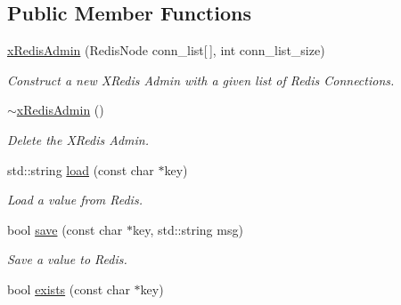 \subsection*{Public Member Functions}
\begin{DoxyCompactItemize}
\item 
\hypertarget{classxRedisAdmin_ae59b7611ff2d0cd4549794e4622d1251}{\hyperlink{classxRedisAdmin_ae59b7611ff2d0cd4549794e4622d1251}{x\-Redis\-Admin} (Redis\-Node conn\-\_\-list\mbox{[}$\,$\mbox{]}, int conn\-\_\-list\-\_\-size)}\label{classxRedisAdmin_ae59b7611ff2d0cd4549794e4622d1251}

\begin{DoxyCompactList}\small\item\em Construct a new X\-Redis Admin with a given list of Redis Connections. \end{DoxyCompactList}\item 
\hypertarget{classxRedisAdmin_a06d156c9ba252cbd5bd48d1f199a7e97}{\hyperlink{classxRedisAdmin_a06d156c9ba252cbd5bd48d1f199a7e97}{$\sim$x\-Redis\-Admin} ()}\label{classxRedisAdmin_a06d156c9ba252cbd5bd48d1f199a7e97}

\begin{DoxyCompactList}\small\item\em Delete the X\-Redis Admin. \end{DoxyCompactList}\item 
\hypertarget{classxRedisAdmin_aa19abdf1562f23acd7193756bfbf1c2a}{std\-::string \hyperlink{classxRedisAdmin_aa19abdf1562f23acd7193756bfbf1c2a}{load} (const char $\ast$key)}\label{classxRedisAdmin_aa19abdf1562f23acd7193756bfbf1c2a}

\begin{DoxyCompactList}\small\item\em Load a value from Redis. \end{DoxyCompactList}\item 
\hypertarget{classxRedisAdmin_ab5a36717fae762eeb88213a7fb349c14}{bool \hyperlink{classxRedisAdmin_ab5a36717fae762eeb88213a7fb349c14}{save} (const char $\ast$key, std\-::string msg)}\label{classxRedisAdmin_ab5a36717fae762eeb88213a7fb349c14}

\begin{DoxyCompactList}\small\item\em Save a value to Redis. \end{DoxyCompactList}\item 
\hypertarget{classxRedisAdmin_afe27654a8ff1783b03f5dc403d2c82e6}{bool \hyperlink{classxRedisAdmin_afe27654a8ff1783b03f5dc403d2c82e6}{exists} (const char $\ast$key)}\label{classxRedisAdmin_afe27654a8ff1783b03f5dc403d2c82e6}


\end{DoxyCompactItemize}
